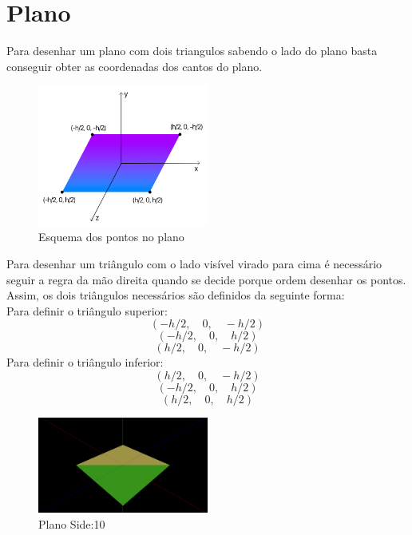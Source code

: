 \documentclass[a4paper]{report}
\begin{document}
\section{Plano}
Para desenhar um plano com dois triangulos sabendo o lado do plano basta
conseguir obter as coordenadas dos cantos do plano.\\
\begin{figure}[H]
    \centering 
    \includegraphics[width=0.5\textwidth]{images/esquema_plano.png}  
    \caption{Esquema dos pontos no plano}
    \label{fig:scheme_plane}
\end{figure}
Para desenhar um triângulo com o lado visível virado para cima é necessário
seguir a regra da mão direita quando se decide porque ordem desenhar os pontos.
Assim, os dois triângulos necessários são definidos da seguinte forma:\\
Para definir o triângulo superior:
\[(-h/2,\quad 0, \quad -h/2)\]
\[(-h/2,\quad  0, \quad h/2)\]
\[(h/2,\quad  0, \quad -h/2)\]
Para definir o triângulo inferior:
\[(h/2, \quad 0, \quad -h/2)\]
\[(-h/2, \quad  0, \quad  h/2)\]
\[(h/2, \quad  0, \quad h/2)\]

\begin{figure}[H]
    \centering 
    \includegraphics[width=0.5\textwidth]{images/plane.png}  
    \caption{Plano Side:10}
    \label{fig:plane}
\end{figure}
\end{document}
